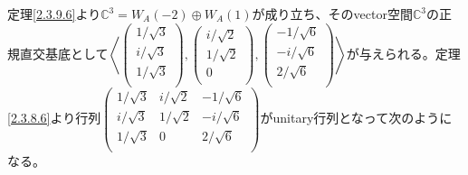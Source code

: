 \documentclass[dvipdfmx]{jsarticle}
\begin{document}
定理\ref{2.3.9.6}より$\mathbb{C}^{3} = W_{A}( - 2) \oplus W_{A}(1)$が成り立ち、そのvector空間$\mathbb{C}^{3}$の正規直交基底として$\left\langle \begin{pmatrix}
{1}/{\sqrt{3}} \\
{i}/{\sqrt{3}} \\
{1}/{\sqrt{3}} \\
\end{pmatrix},\begin{pmatrix}
{i}/{\sqrt{2}} \\
{1}/{\sqrt{2}} \\
0 \\
\end{pmatrix},\begin{pmatrix}
 - {1}/{\sqrt{6}} \\
 - {i}/{\sqrt{6}} \\
{2}/{\sqrt{6}} \\
\end{pmatrix} \right\rangle$が与えられる。定理\ref{2.3.8.6}より行列$\begin{pmatrix}
{1}/{\sqrt{3}} & {i}/{\sqrt{2}} & - {1}/{\sqrt{6}} \\
{i}/{\sqrt{3}} & {1}/{\sqrt{2}} & - {i}/{\sqrt{6}} \\
{1}/{\sqrt{3}} & 0 & {2}/{\sqrt{6}} \\
\end{pmatrix}$がunitary行列となって次のようになる。
\end{document}
